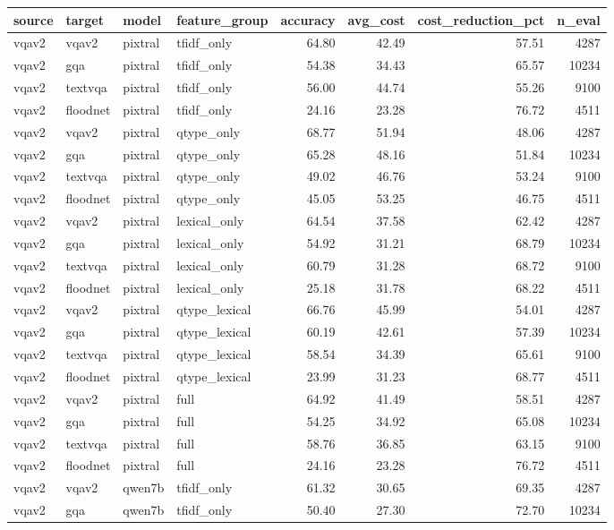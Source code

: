 \begin{tabular}{llllrrrr}
\toprule
source & target & model & feature_group & accuracy & avg_cost & cost_reduction_pct & n_eval \\
\midrule
vqav2 & vqav2 & pixtral & tfidf_only & 64.80 & 42.49 & 57.51 & 4287 \\
vqav2 & gqa & pixtral & tfidf_only & 54.38 & 34.43 & 65.57 & 10234 \\
vqav2 & textvqa & pixtral & tfidf_only & 56.00 & 44.74 & 55.26 & 9100 \\
vqav2 & floodnet & pixtral & tfidf_only & 24.16 & 23.28 & 76.72 & 4511 \\
vqav2 & vqav2 & pixtral & qtype_only & 68.77 & 51.94 & 48.06 & 4287 \\
vqav2 & gqa & pixtral & qtype_only & 65.28 & 48.16 & 51.84 & 10234 \\
vqav2 & textvqa & pixtral & qtype_only & 49.02 & 46.76 & 53.24 & 9100 \\
vqav2 & floodnet & pixtral & qtype_only & 45.05 & 53.25 & 46.75 & 4511 \\
vqav2 & vqav2 & pixtral & lexical_only & 64.54 & 37.58 & 62.42 & 4287 \\
vqav2 & gqa & pixtral & lexical_only & 54.92 & 31.21 & 68.79 & 10234 \\
vqav2 & textvqa & pixtral & lexical_only & 60.79 & 31.28 & 68.72 & 9100 \\
vqav2 & floodnet & pixtral & lexical_only & 25.18 & 31.78 & 68.22 & 4511 \\
vqav2 & vqav2 & pixtral & qtype_lexical & 66.76 & 45.99 & 54.01 & 4287 \\
vqav2 & gqa & pixtral & qtype_lexical & 60.19 & 42.61 & 57.39 & 10234 \\
vqav2 & textvqa & pixtral & qtype_lexical & 58.54 & 34.39 & 65.61 & 9100 \\
vqav2 & floodnet & pixtral & qtype_lexical & 23.99 & 31.23 & 68.77 & 4511 \\
vqav2 & vqav2 & pixtral & full & 64.92 & 41.49 & 58.51 & 4287 \\
vqav2 & gqa & pixtral & full & 54.25 & 34.92 & 65.08 & 10234 \\
vqav2 & textvqa & pixtral & full & 58.76 & 36.85 & 63.15 & 9100 \\
vqav2 & floodnet & pixtral & full & 24.16 & 23.28 & 76.72 & 4511 \\
vqav2 & vqav2 & qwen7b & tfidf_only & 61.32 & 30.65 & 69.35 & 4287 \\
vqav2 & gqa & qwen7b & tfidf_only & 50.40 & 27.30 & 72.70 & 10234 \\

\end{tabular}
